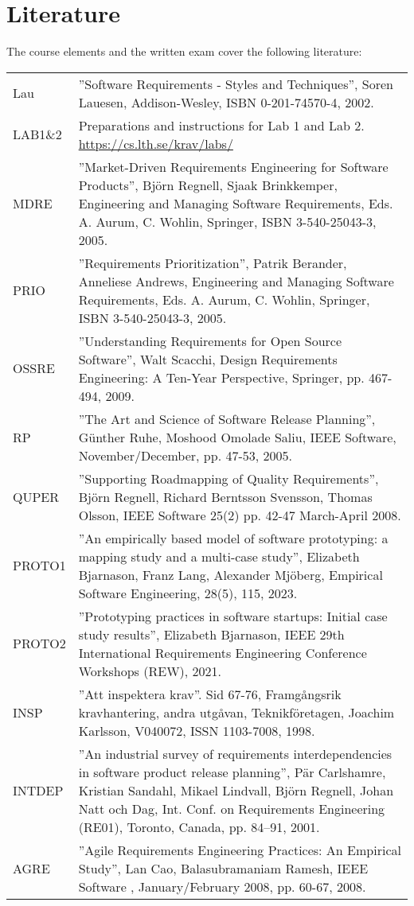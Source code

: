 \documentclass{program}
\begin{document}
\section{Literature}
The course elements and the written exam cover the following literature: 
\begin{flushleft}
\setlength{\tabcolsep}{0pt}
\begin{tabular}{p{} p{}}
Lau & ''Software Requirements - Styles and Techniques'', Soren Lauesen, Addison-Wesley, ISBN 0-201-74570-4, 2002. \\
LAB1\&2	&Preparations and instructions for Lab 1 and Lab 2. \newline \url{https://cs.lth.se/krav/labs/}\\
MDRE &	''Market-Driven Requirements Engineering for Software Products'', Björn Regnell, Sjaak Brinkkemper, Engineering and Managing Software Requirements, Eds. A. Aurum, C. Wohlin, Springer,  ISBN 3-540-25043-3, 2005.\\
PRIO&	''Requirements Prioritization'', Patrik Berander, Anneliese Andrews, Engineering and Managing Software Requirements, Eds. A. Aurum, C. Wohlin, Springer,  ISBN 3-540-25043-3, 2005. \\
OSSRE & ''Understanding Requirements for Open Source Software'', Walt Scacchi, Design Requirements Engineering: A Ten-Year Perspective, Springer, pp. 467-494, 2009.\\
RP&	''The Art and Science of Software Release Planning'', Günther Ruhe, Moshood Omolade Saliu, IEEE Software, November/December, pp. 47-53, 2005. \\
QUPER&	''Supporting Roadmapping of Quality Requirements'', Björn Regnell, Richard Berntsson Svensson, 
Thomas Olsson, IEEE Software 25(2) pp. 42-47 March-April 2008. \\
PROTO1& ''An empirically based model of software prototyping: a mapping study and a multi-case study'', Elizabeth Bjarnason, Franz Lang, Alexander Mjöberg, Empirical Software Engineering, 28(5), 115, 2023.\\
PROTO2& ''Prototyping practices in software startups: Initial case study results'', Elizabeth Bjarnason, IEEE 29th International Requirements Engineering Conference Workshops (REW), 2021.\\
INSP&	''Att inspektera krav''. Sid 67-76, Framgångsrik kravhantering, andra utgåvan, Teknikföretagen, Joachim Karlsson, V040072, ISSN 1103-7008, 1998.\\
INTDEP &	''An industrial survey of requirements interdependencies in software product release planning'', Pär Carlshamre, Kristian Sandahl, Mikael Lindvall, Björn Regnell, Johan Natt och Dag, Int. Conf. on Requirements Engineering (RE01), Toronto, Canada, pp. 84–91, 2001.\\
AGRE &	''Agile Requirements Engineering Practices: An Empirical Study'', Lan Cao, Balasubramaniam Ramesh, IEEE Software , January/February 2008, pp. 60-67, 2008.\\
\end{tabular}
\end{flushleft}
\end{document}
